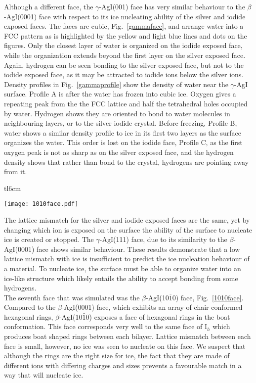 \documentclass[titlepage]{article}
\begin{document}
\indent Although a different face, the $\gamma$-AgI(001) face has very similar behaviour to the $\beta$-AgI(0001) face with respect to its ice nucleating ability of the silver and iodide exposed faces.  The faces are cubic, Fig.~\ref{gammaface}, and arrange water into a FCC pattern as is highlighted by the yellow and light blue lines and dots on the figures.  Only the closest layer of water is organized on the iodide exposed face, while the organization extends beyond the first layer on the silver exposed face.  Again, hydrogen can be seen bonding to the silver exposed face, but not to the iodide exposed face, as it may be attracted to iodide ions below the silver ions.  Density profiles in Fig.~\ref{gammaprofile} show the density of water near the $\gamma$-AgI surface.  Profile A is after the water has frozen into cubic ice.  Oxygen gives a repeating peak from the the FCC lattice and half the tetrahedral holes occupied by water.  Hydrogen shows they are oriented to bond to water molecules in neighbouring layers, or to the silver iodide crystal.  Before freezing, Profile B, water shows a similar density profile to ice in its first two layers as the surface organizes the water.  This order is lost on the iodide face, Profile C, as the first oxygen peak is not as sharp as on the silver exposed face, and the hydrogen density shows that rather than bond to the crystal, hydrogens are pointing away from it.
\begin{wrapfigure}{tl}{6cm}
	\begin{center}
		\texttt{[image: 1010face.pdf]}
		\caption{First layer of water near the $\beta$-AgI(10$\bar{1}$0) face.  Yellow lines show a ring that is concave out of the page, and the light blue a ring that is convex.}
	\label{1010face}
	\end{center}
	
\end{wrapfigure}
\indent The lattice mismatch for the silver and iodide exposed faces are the same, yet by changing which ion is exposed on the surface the ability of the surface to nucleate ice is created or stopped.  The $\gamma$-AgI(111) face, due to its similarity to the $\beta$-AgI(0001) face shows similar behaviour.  These results demonstrate that a low lattice mismatch with ice is insufficient to predict the ice nucleation behaviour of a material.  To nucleate ice, the surface must be able to organize water into an ice-like structure which likely entails the ability to accept bonding from some hydrogens.\\
\indent The seventh face that was simulated was the $\beta$-AgI(10$\bar{1}$0) face, Fig.~\ref{1010face}.  Compared to the $\beta$-AgI(0001) face, which exhibits an array of chair conformed hexagonal rings, $\beta$-AgI(10$\bar{1}$0) exposes a face of hexagonal rings in the boat conformation.  This face corresponds very well to the same face of I$_{h}$ which produces boat shaped rings between each bilayer.  Lattice mismatch between each face is small, however, no ice was seen to nucleate on this face.  We suspect that although the rings are the right size for ice, the fact that they are made of different ions with differing charges and sizes prevents a favourable match in a way that will nucleate ice.\\
\end{document}
